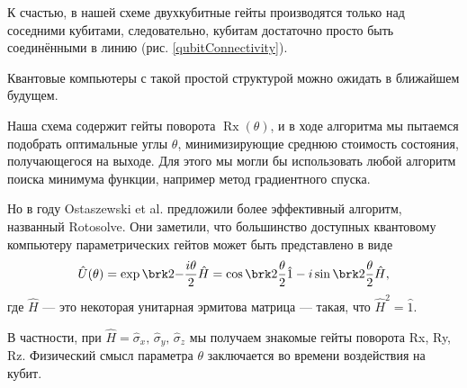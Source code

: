 К счастью, в нашей схеме двухкубитные гейты производятся только над соседними кубитами, следовательно, кубитам достаточно просто быть соединёнными в линию (рис. \ref{qubitConnectivity}).

\vspace{0.2em}


Квантовые компьютеры с такой простой структурой можно ожидать в ближайшем будущем.



Наша схема содержит гейты поворота $\operatorname{Rx}(\theta)$, и в ходе алгоритма мы пытаемся подобрать оптимальные углы $\theta$, минимизирующие среднюю стоимость состояния, получающегося на выходе. Для этого мы могли бы использовать любой алгоритм поиска минимума функции, например метод градиентного спуска.

Но в  году Ostaszewski et al. \cite{rotosolve} предложили более эффективный алгоритм, названный Rotosolve. Они заметили, что большинство доступных квантовому компьютеру параметрических гейтов может быть представлено в виде
\begin{equation}
\hat U(\theta) 
= \exp\brk2{-\frac{i \theta}{2} \hat H}
= \cos\brk2{\frac{\theta}{2}} \hat 1 - i \sin\brk2{\frac{\theta}{2}} \hat H,
\label{eq:exp}
\end{equation}
где $\hat H$ --- это некоторая унитарная эрмитова матрица --- такая, что $\hat H^2 = \hat 1.$

В частности, при 
$\hat H = \hat \sigma_x,\, \hat \sigma_y,\, \hat \sigma_z$
мы получаем знакомые гейты поворота Rx, Ry, Rz.
Физический смысл параметра $\theta$ заключается во времени воздействия на кубит.



